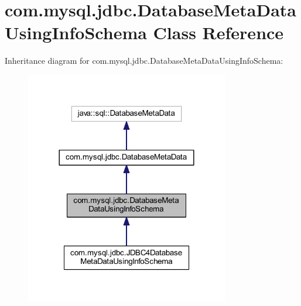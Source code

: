 \hypertarget{classcom_1_1mysql_1_1jdbc_1_1_database_meta_data_using_info_schema}{}\section{com.\+mysql.\+jdbc.\+Database\+Meta\+Data\+Using\+Info\+Schema Class Reference}
\label{classcom_1_1mysql_1_1jdbc_1_1_database_meta_data_using_info_schema}


Inheritance diagram for com.\+mysql.\+jdbc.\+Database\+Meta\+Data\+Using\+Info\+Schema\+:
\nopagebreak
\begin{figure}[H]
\begin{center}
\leavevmode
\includegraphics[width=252pt]{classcom_1_1mysql_1_1jdbc_1_1_database_meta_data_using_info_schema__inherit__graph}
\end{center}
\end{figure}


